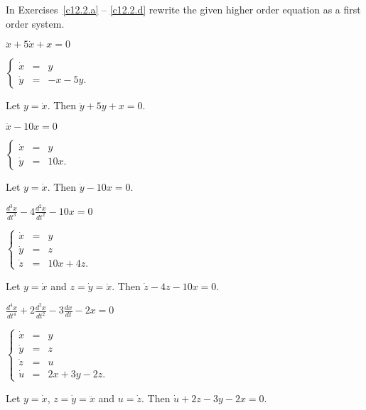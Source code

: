 \documentclass{ximera}
\begin{document}
\noindent In Exercises~\ref{c12.2.a} -- \ref{c12.2.d} rewrite the given
higher order equation as a first order system.
\begin{exercise} \label{c12.2.a}
$\ddot{x}+5\dot{x}+x = 0$

\begin{solution}
\ans $\left\{\begin{array}{rcl} \dot{x} & = & y \\
\dot{y} & = & -x-5y. \end{array}\right.$

\soln  Let $y = \dot{x}$.  Then $\dot{y}+5y+x=0$.


\end{solution}
\end{exercise}
\begin{exercise} \label{c12.2.b}
$\ddot{x}-10x = 0$

\begin{solution}
\ans $\left\{\begin{array}{rcl} \dot{x} & = & y \\
\dot{y} & = & 10x. \end{array}\right.$

\soln  Let $y = \dot{x}$.  Then $\dot{y}-10x=0$.


\end{solution}
\end{exercise}
\begin{exercise} \label{c12.2.c}
$\frac{d^3x}{dt^3}-4\frac{d^2x}{dt^2}-10x = 0$

\begin{solution}
\ans $\left\{\begin{array}{rcl} \dot{x} & = & y \\
\dot{y} & = & z\\
\dot{z} & = & 10x+4z. \end{array}\right.$

\soln  Let $y = \dot{x}$ and $z=\dot{y}=\ddot{x}$.  Then 
$\dot{z}-4z-10x=0$.


\end{solution}
\end{exercise}
\begin{exercise} \label{c12.2.d}
$\frac{d^4x}{dt^4}+2\frac{d^2x}{dt^2}-3\frac{dx}{dt}-2x = 0$

\begin{solution}
\ans $\left\{\begin{array}{rcl} \dot{x} & = & y \\
\dot{y} & = & z\\
\dot{z} & = & u\\
\dot{u} & = & 2x+3y-2z. \end{array}\right.$

\soln  Let $y = \dot{x}$, $z=\dot{y}=\ddot{x}$ and $u=\dot{z}$.  Then 
$\dot{u}+2z-3y-2x=0$.

\end{solution}
\end{exercise}
\end{document}
